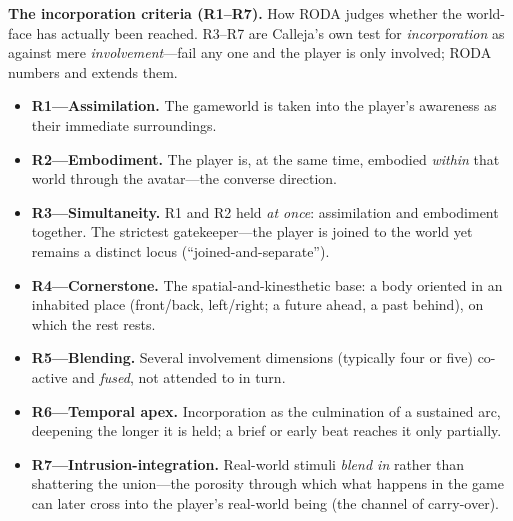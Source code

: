 \documentclass[11pt]{article}
\begin{document}
\medskip
\noindent\textbf{The incorporation criteria (R1--R7).} How RODA judges whether the world-face has actually been reached. R3--R7 are Calleja's own test for \emph{incorporation} as against mere \emph{involvement}---fail any one and the player is only involved; RODA numbers and extends them.
\begin{itemize}
  \item \textbf{R1---Assimilation.} The gameworld is taken into the player's awareness as their immediate surroundings.
  \item \textbf{R2---Embodiment.} The player is, at the same time, embodied \emph{within} that world through the avatar---the converse direction.
  \item \textbf{R3---Simultaneity.} R1 and R2 held \emph{at once}: assimilation and embodiment together. The strictest gatekeeper---the player is joined to the world yet remains a distinct locus (``joined-and-separate'').
  \item \textbf{R4---Cornerstone.} The spatial-and-kinesthetic base: a body oriented in an inhabited place (front/back, left/right; a future ahead, a past behind), on which the rest rests.
  \item \textbf{R5---Blending.} Several involvement dimensions (typically four or five) co-active and \emph{fused}, not attended to in turn.
  \item \textbf{R6---Temporal apex.} Incorporation as the culmination of a sustained arc, deepening the longer it is held; a brief or early beat reaches it only partially.
  \item \textbf{R7---Intrusion-integration.} Real-world stimuli \emph{blend in} rather than shattering the union---the porosity through which what happens in the game can later cross into the player's real-world being (the channel of carry-over).
\end{itemize}
\end{document}

